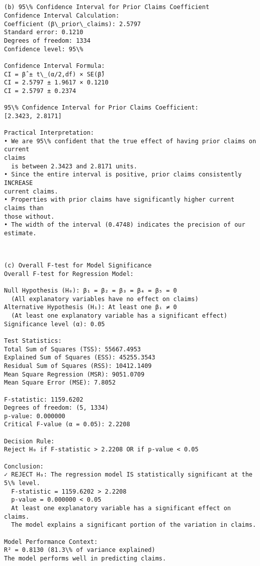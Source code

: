 \documentclass[8pt, twocolumn]{extarticle}
\begin{document}
    \begin{Verbatim}[commandchars=\\\{\}]


(b) 95\% Confidence Interval for Prior Claims Coefficient
Confidence Interval Calculation:
Coefficient (β\_prior\_claims): 2.5797
Standard error: 0.1210
Degrees of freedom: 1334
Confidence level: 95\%

Confidence Interval Formula:
CI = β̂ ± t\_(α/2,df) × SE(β̂)
CI = 2.5797 ± 1.9617 × 0.1210
CI = 2.5797 ± 0.2374

95\% Confidence Interval for Prior Claims Coefficient:
[2.3423, 2.8171]

Practical Interpretation:
• We are 95\% confident that the true effect of having prior claims on current
claims
  is between 2.3423 and 2.8171 units.
• Since the entire interval is positive, prior claims consistently INCREASE
current claims.
• Properties with prior claims have significantly higher current claims than
those without.
• The width of the interval (0.4748) indicates the precision of our estimate.
    \end{Verbatim}

    \begin{Verbatim}[commandchars=\\\{\}]


(c) Overall F-test for Model Significance
Overall F-test for Regression Model:

Null Hypothesis (H₀): β₁ = β₂ = β₃ = β₄ = β₅ = 0
  (All explanatory variables have no effect on claims)
Alternative Hypothesis (H₁): At least one βᵢ ≠ 0
  (At least one explanatory variable has a significant effect)
Significance level (α): 0.05

Test Statistics:
Total Sum of Squares (TSS): 55667.4953
Explained Sum of Squares (ESS): 45255.3543
Residual Sum of Squares (RSS): 10412.1409
Mean Square Regression (MSR): 9051.0709
Mean Square Error (MSE): 7.8052

F-statistic: 1159.6202
Degrees of freedom: (5, 1334)
p-value: 0.000000
Critical F-value (α = 0.05): 2.2208

Decision Rule:
Reject H₀ if F-statistic > 2.2208 OR if p-value < 0.05

Conclusion:
✓ REJECT H₀: The regression model IS statistically significant at the 5\% level.
  F-statistic = 1159.6202 > 2.2208
  p-value = 0.000000 < 0.05
  At least one explanatory variable has a significant effect on claims.
  The model explains a significant portion of the variation in claims.

Model Performance Context:
R² = 0.8130 (81.3\% of variance explained)
The model performs well in predicting claims.
    \end{Verbatim}
\end{document}
